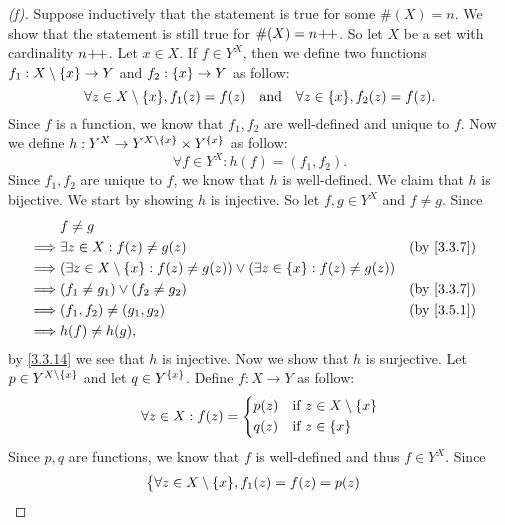 \begin{proof}[(f)]
	Suppose inductively that the statement is true for some \(\#(X) = n\).
	We show that the statement is still true for \(\#(X) = n\!+\!\!+\).
	So let \(X\) be a set with cardinality \(n\!+\!\!+\).
	Let \(x \in X\).
	If \(f \in Y^X\), then we define two functions \(f_1 : X \setminus \left\lbrace x\right\rbrace \to Y\) and \(f_2 : \left\lbrace x\right\rbrace \to Y\) as follow:
	\[
		\forall z \in X \setminus \set{x}, f_1(z) = f(z) \quad \text{and} \quad \forall z \in \set{x}, f_2(z) = f(z).
	\]
	Since \(f\) is a function, we know that \(f_1, f_2\) are well-defined and unique to \(f\).
	Now we define \(h : Y^X \to Y^{X \setminus \left\lbrace x\right\rbrace} \times Y^{\left\lbrace x\right\rbrace}\) as follow:
	\[
		\forall f \in Y^X : h(f) = (f_1, f_2).
	\]
	Since \(f_1, f_2\) are unique to \(f\), we know that \(h\) is well-defined.
	We claim that \(h\) is bijective.
	We start by showing \(h\) is injective.
	So let \(f, g \in Y^X\) and \(f \neq g\).
	Since
	\begin{align*}
		         & f \neq g                                                                                                           \\
		\implies & \exists z \in X : f(z) \neq g(z)                                                                   &  & \by{3.3.7} \\
		\implies & (\exists z \in X \setminus \set{x} : f(z) \neq g(z)) \lor (\exists z \in \set{x} : f(z) \neq g(z))                 \\
		\implies & (f_1 \neq g_1) \lor (f_2 \neq g_2)                                                                 &  & \by{3.3.7} \\
		\implies & (f_1, f_2) \neq (g_1, g_2)                                                                         &  & \by{3.5.1} \\
		\implies & h(f) \neq h(g),
	\end{align*}
	by \cref{3.3.14} we see that \(h\) is injective.
	Now we show that \(h\) is surjective.
	Let \(p \in Y^{X \setminus \left\lbrace x\right\rbrace}\) and let \(q \in Y^{\left\lbrace x\right\rbrace}\).
	Define \(f : X \to Y\) as follow:
	\[
		\forall z \in X : f(z) = \begin{dcases}
			p(z) & \text{if } z \in X \setminus \left\lbrace x\right\rbrace \\
			q(z) & \text{if } z \in \left\lbrace x\right\rbrace
		\end{dcases}
	\]
	Since \(p, q\) are functions, we know that \(f\) is well-defined and thus \(f \in Y^X\).
	Since
	\begin{align*}
		         & \begin{dcases}
			           \forall z \in X \setminus \set{x}, f_1(z) = f(z) = p(z) \\

\end{dcases}
\end{align*}
\end{proof}
